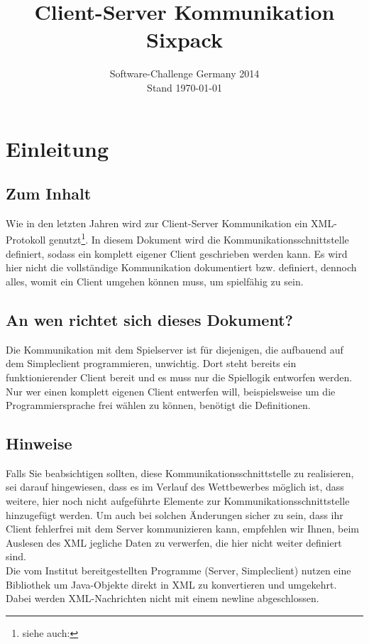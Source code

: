 \documentclass[12pt,a4paper, ngerman, oneside]{scrartcl}
\date{Software-Challenge Germany 2014\\Stand \today}
\title{Client-Server Kommunikation Sixpack}
\begin{document}
\maketitle
\thispagestyle{empty}
\tableofcontents
\thispagestyle{empty}
\newpage
\setcounter{page}{1}
\section{Einleitung}
\subsection*{Zum Inhalt} Wie in den letzten Jahren wird zur Client-Server
Kommunikation ein XML-Protokoll genutzt\footnote{siehe auch:
}. In diesem
Dokument wird die Kommunikationsschnittstelle definiert, sodass ein komplett
eigener Client geschrieben werden kann. Es wird hier nicht die vollständige
Kommunikation dokumentiert bzw. definiert, dennoch alles, womit ein Client
umgehen können muss, um spielfähig zu sein.
\subsection*{An wen richtet sich dieses Dokument?} Die Kommunikation mit dem
Spielserver ist für diejenigen, die aufbauend auf dem Simpleclient
programmieren, unwichtig. Dort steht bereits ein funktionierender Client bereit
und es muss nur die Spiellogik entworfen werden. \\
Nur wer einen komplett eigenen Client entwerfen will, beispielsweise um die
Programmiersprache frei wählen zu können, benötigt die Definitionen.

\subsection*{Hinweise} Falls Sie beabsichtigen sollten, diese
Kommunikationsschnittstelle zu realisieren, sei darauf hingewiesen, dass es im
Verlauf des Wettbewerbes möglich ist, dass weitere, hier noch nicht aufgeführte
Elemente zur Kommunikationsschnittstelle hinzugefügt werden. Um auch bei solchen
Änderungen sicher zu sein, dass ihr Client fehlerfrei mit dem Server
kommunizieren kann, empfehlen wir Ihnen, beim Auslesen des XML jegliche Daten zu
verwerfen, die hier nicht weiter definiert sind. \bigskip \\
Die vom Institut bereitgestellten Programme (Server, Simpleclient) nutzen eine
Bibliothek um Java-Objekte direkt in XML zu konvertieren und umgekehrt. 
Dabei werden XML-Nachrichten nicht mit einem newline abgeschlossen.
\end{document}
